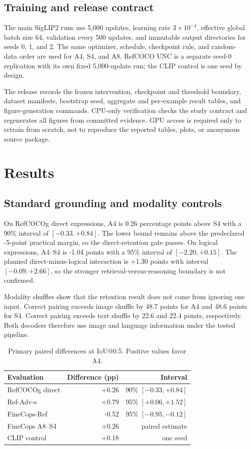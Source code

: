 \documentclass[conference]{IEEEtran}
\begin{document}
\subsection{Training and release contract}
The main SigLIP2 runs use 5,000 updates, learning rate $3\times10^{-4}$, effective global batch size 64, validation every 500 updates, and immutable output directories for seeds 0, 1, and 2. The same optimizer, schedule, checkpoint rule, and random-data order are used for A4, S4, and A8. RefCOCO UNC is a separate seed-0 replication with its own fixed 5,000-update run; the CLIP control is one seed by design.

The release records the frozen intervention, checkpoint and threshold boundary, dataset manifests, bootstrap seed, aggregate and per-example result tables, and figure-generation commands. CPU-only verification checks the study contract and regenerates all figures from committed evidence. GPU access is required only to retrain from scratch, not to reproduce the reported tables, plots, or anonymous source package.

\section{Results}
\subsection{Standard grounding and modality controls}
On RefCOCOg direct expressions, A4 is 0.26 percentage points above S4 with a 90\% interval of $[-0.33,+0.84]$. The lower bound remains above the predeclared -5-point practical margin, so the direct-retention gate passes. On logical expressions, A4--S4 is -1.04 points with a 95\% interval of $[-2.20,+0.15]$. The planned direct-minus-logical interaction is +1.30 points with interval $[-0.09,+2.66]$, so the stronger retrieval-versus-reasoning boundary is not confirmed.

Modality shuffles show that the retention result does not come from ignoring one input. Correct pairing exceeds image shuffle by 48.7 points for A4 and 48.6 points for S4. Correct pairing exceeds text shuffle by 22.6 and 22.4 points, respectively. Both decoders therefore use image and language information under the tested pipeline.

\begin{table}[t]
\centering
\caption{Primary paired differences at IoU@0.5. Positive values favor A4.}
\label{tab:results}
\small
\begin{tabular}{lrr}
\toprule
Evaluation & Difference (pp) & Interval \\
\midrule
RefCOCOg direct & +0.26 & 90\% $[-0.33,+0.84]$ \\
Ref-Adv-s & +0.79 & 95\% $[+0.06,+1.52]$ \\
FineCops-Ref & -0.52 & 95\% $[-0.95,-0.12]$ \\
FineCops A8--S4 & +0.26 & paired estimate \\
CLIP control & +0.18 & one seed \\
\bottomrule
\end{tabular}
\end{table}
\end{document}
